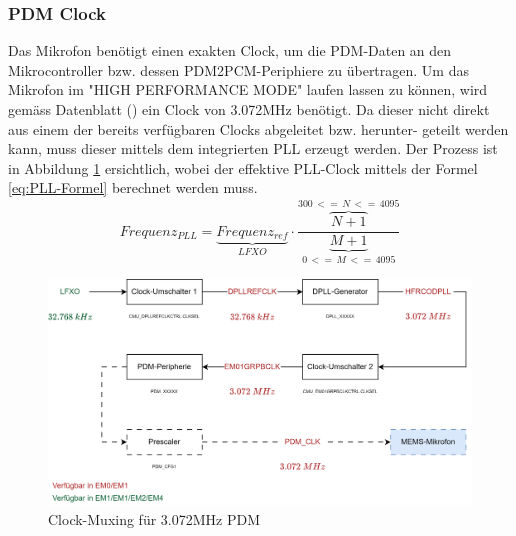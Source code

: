 \documentclass[12pt]{article}
\begin{document}
	\subsubsection*{PDM Clock}
	Das Mikrofon benötigt einen exakten Clock, um die PDM-Daten an den Mikrocontroller bzw. dessen PDM2PCM-Periphiere zu übertragen. Um das Mikrofon im "HIGH PERFORMANCE MODE" laufen lassen zu können, wird gemäss Datenblatt (\cite{noauthor_httpsinvensensetdkcomwp-contentuploads202007ds-000157-ics-41351-v14pdf_nodate}) ein Clock von 3.072MHz benötigt. Da dieser nicht direkt aus einem der bereits verfügbaren Clocks abgeleitet bzw. herunter- geteilt werden kann, muss dieser mittels dem integrierten PLL erzeugt werden. Der Prozess ist in Abbildung \ref{fig:batclock-muxing-pdm} ersichtlich, wobei der effektive PLL-Clock mittels der Formel \ref{eq:PLL-Formel} berechnet werden muss.
	\begin{equation}\label{eq:PLL-Formel}
		Frequenz_{PLL} = \underbrace{Frequenz_{ref}}_{LFXO} \cdot \frac{\overbrace{N+1}^{300\,<=\, N \, <= \, 4095}}{\underbrace{M+1}_{0\,<=\,M\,<=\,4095}}
	\end{equation}
	\begin{figure}[H]
		\centering
		\includegraphics[width=1\linewidth]{images/BAT_Clock-Muxing-PDM}
		\caption{Clock-Muxing für 3.072MHz PDM}
		\label{fig:batclock-muxing-pdm}
	\end{figure}
\end{document}
